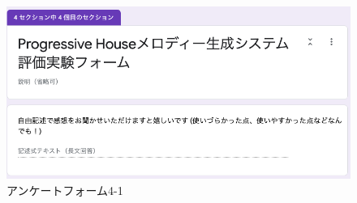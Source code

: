 \begin{figure}[htbp]
	\begin{center}
		\includegraphics[width=14.5cm]{image/forms/form5.png}
		\caption{アンケートフォーム4-1}
	\end{center}
\end{figure}